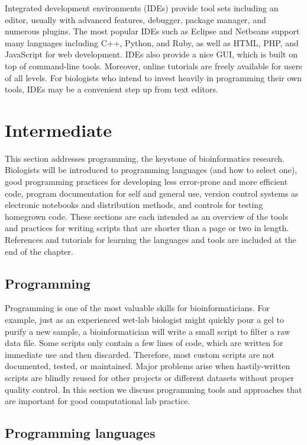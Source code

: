 \documentclass[ChapterTOCs,krantz2]{krantz} %
\begin{document}
Integrated development environments (IDEs) provide tool sets
including an editor, usually with advanced features, debugger, package manager,
and numerous plugins. The most popular IDEs such as 
Eclipse and Netbeans support many languages including
C++, Python, and Ruby, as well as HTML, PHP, and JavaScript for web
development. IDEs also provide a nice GUI, which is built on
top of command-line tools.  Moreover, 
online tutorials are freely available for users of all levels.  For biologists who 
intend to invest heavily in programming their own tools, IDEs may be a convenient step 
up from text editors.

\section{Intermediate} This section addresses programming, the keystone of
bioinformatics research.  Biologists will be introduced to 
programming languages (and how to select one), good programming practices for
developing less error-prone and more efficient code, program documentation for self and
general use, version control systems as electronic notebooks
and distribution methods, and controls for testing homegrown code.  These
sections are each intended as an overview of the tools and practices for
writing scripts that are shorter than a page or two in length.  References and
tutorials for learning the languages and tools are included at the end of the
chapter. 

\subsection{Programming} Programming is one of the most valuable skills for 
bioinformaticians. For example, just
as an experienced wet-lab biologist might quickly pour a gel to
purify a new sample, a bioinformatician will write a small
script to filter a raw data file. Some scripts only contain a few
lines of code, which are written for immediate use and then discarded.  
Therefore, most custom scripts are not documented, tested, or 
maintained.  Major problems arise when hastily-written scripts are blindly
reused for other projects or different datasets without proper quality control.  In
this section we discuss programming tools and approaches that are 
important for good computational lab practice.

\subsection{Programming languages}
\end{document}
